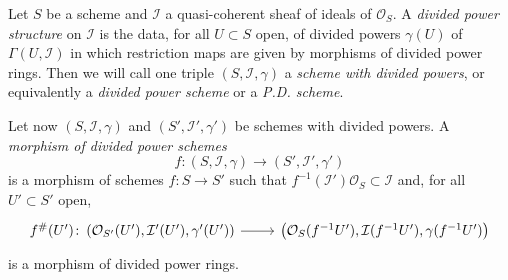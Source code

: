 \begin{defn}\label{defn:DividedPowersSheaf}
	Let $S$ be a scheme and $\mathcal{I}$ a quasi-coherent sheaf
	of ideals of $\mathcal{O}_{ S }$.
	A \emph{divided power structure} on $\mathcal{I}$ is the data,
	for all $U \subset S$ open, of divided powers $\gamma(U)$ 
	of $\Gamma(U,\mathcal{I})$ in which restriction maps
	are given by morphisms of divided power rings.
	Then we will call one triple $\left(S, \mathcal{I}, \gamma\right)$
	a \emph{scheme with divided powers}, or equivalently
	a \emph{divided power scheme} or a \emph{P.D. scheme}.

	Let now $\left(S, \mathcal{I}, \gamma\right)$ and $\left(S', \mathcal{I}', \gamma'\right)$
	be schemes with divided powers.
	A \emph{morphism of divided power schemes}
	\begin{equation*}
	f\colon \left(S, \mathcal{I}, \gamma\right) \to 
	\left(S', \mathcal{I}', \gamma'\right)
	\end{equation*}
	is a morphism of schemes
	$f\colon S \to S'$ such that
	$f^{-1}(\mathcal{I}') \mathcal{O}_S \subset \mathcal{I}$
	and, for all $U' \subset S'$ open,
	\begin{equation*}
	\begin{tikzcd}[row sep = 0ex
		,/tikz/column 1/.append style={anchor=base east}
		,/tikz/column 2/.append style={anchor=base west}]
		f^\#(U')\colon 
		\left(\mathcal{O}_{S'}(U'), \mathcal{I}'(U'), \gamma'(U')\right)
		\arrow[r, "", rightarrow] &
		\left(\mathcal{O}_{ S }(f^{-1}U'), \mathcal{I}(f^{-1}U'), \gamma(f^{-1}U')\right)
	\end{tikzcd}
	\end{equation*} 
	is a morphism of divided power rings.
\end{defn}


